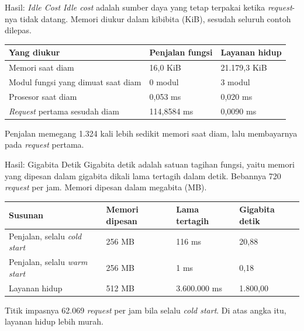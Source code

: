 \documentclass[aspectratio=169, table, 12pt]{beamer}
\begin{document}
\begin{frame}{{\Large Hasil: \textit{Idle Cost}}}
  \vspace{10pt}
  {\small \textit{Idle cost} adalah sumber daya yang tetap terpakai ketika
  \textit{request}-nya tidak datang. Memori diukur dalam kibibita (KiB),
  sesudah seluruh contoh dilepas.}

  \vspace{4pt}
  \centering
  \small
  \begin{tabularx}{0.96\textwidth}{|X|l|l|}
    \hline
    \textbf{Yang diukur} & \textbf{Penjalan fungsi} & \textbf{Layanan hidup} \\
    \hline
    Memori saat diam & 16,0 KiB & 21.179,3 KiB \\
    \hline
    Modul fungsi yang dimuat saat diam & 0 modul & 3 modul \\
    \hline
    Prosesor saat diam & 0,053 ms & 0,020 ms \\
    \hline
    \textit{Request} pertama sesudah diam & 114,8584 ms & 0,0090 ms \\
    \hline
  \end{tabularx}

  \vspace{6pt}
  \raggedright
  {\small Penjalan memegang 1.324 kali lebih sedikit memori saat diam, lalu
  membayarnya pada \textit{request} pertama.}
\end{frame}

\begin{frame}{{\Large Hasil: Gigabita Detik}}
  \vspace{10pt}
  {\small Gigabita detik adalah satuan tagihan fungsi, yaitu memori yang
  dipesan dalam gigabita dikali lama tertagih dalam detik. Bebannya 720
  \textit{request} per jam. Memori dipesan dalam megabita (MB).}

  \vspace{4pt}
  \centering
  \small
  \begin{tabularx}{0.96\textwidth}{|l|l|l|X|}
    \hline
    \textbf{Susunan} & \textbf{Memori dipesan} & \textbf{Lama tertagih} & \textbf{Gigabita detik} \\
    \hline
    Penjalan, selalu \textit{cold start} & 256 MB & 116 ms & 20,88 \\
    \hline
    Penjalan, selalu \textit{warm start} & 256 MB & 1 ms & 0,18 \\
    \hline
    Layanan hidup & 512 MB & 3.600.000 ms & 1.800,00 \\
    \hline
  \end{tabularx}

  \vspace{6pt}
  \raggedright
  {\small Titik impasnya 62.069 \textit{request} per jam bila selalu
  \textit{cold start}. Di atas angka itu, layanan hidup lebih murah.}
\end{frame}
\end{document}
